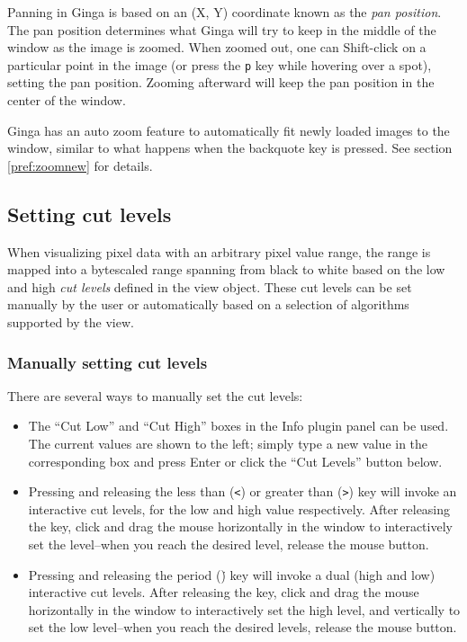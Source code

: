 \documentclass[11pt]{report}
\begin{document}
Panning in Ginga is based on an (X, Y) coordinate known as the 
\emph{pan position}.  The pan position determines what Ginga will 
try to keep in the middle of the window as the image is zoomed.  
When zoomed out, one can Shift-click on a particular point in the image
(or press the {\tt p} key while hovering over a spot),
setting the pan position.  Zooming afterward will keep the pan
position in the center of the window.

Ginga has an auto zoom feature to automatically fit newly loaded images
to the window, similar to what happens when the backquote key is
pressed.  See section \ref{pref:zoomnew} for details.

\subsection{Setting cut levels}
When visualizing pixel data with an arbitrary pixel value range, the
range is mapped into a bytescaled range spanning from black to white
based on the low and high \emph{cut levels} defined in the view object.
These cut levels can be set manually by the user or automatically based
on a selection of algorithms supported by the view.

\subsubsection{Manually setting cut levels}
There are several ways to manually set the cut levels:
\begin{itemize}
\item The ``Cut Low'' and ``Cut High'' boxes in the Info plugin panel
  can be used.  The current values are shown to the left; simply type a
  new value in the corresponding box and press Enter or click the ``Cut
  Levels'' button below.
\item Pressing and releasing the less than ({\tt \textless}) or greater than
 ({\tt \textgreater}) key
  will invoke an interactive cut levels, for the low and high value
  respectively.  After releasing the key, click and drag the mouse
  horizontally in the window to interactively set the level--when you
  reach the desired level, release the mouse button.
\item Pressing and releasing the period ({\tt \.}) key will invoke a 
  dual (high and low) interactive cut levels.  After releasing the key,
  click and drag the mouse horizontally in the window to interactively
  set the high level, and vertically to set the low level--when you
  reach the desired levels, release the mouse button.
\end{itemize}
\end{document}
